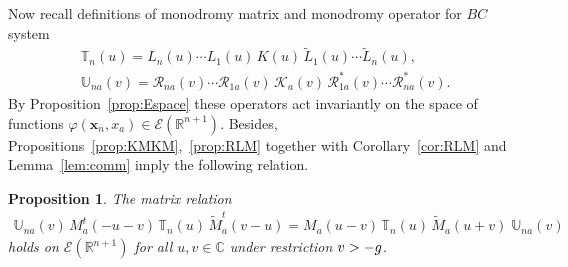 \documentclass[11pt]{article}
\numberwithin{equation}{section}
\theoremstyle{plain}
\newtheorem{proposition}{Proposition}
\theoremstyle{definition}
\newcommand{\T}{\mathbb{T}}
\newcommand{\MMO}{\mathbb{U}}
\let\Im\relax
\DeclareMathOperator{\Im}{Im}
\renewcommand{\phi}{\varphi}
\begin{document}
Now recall definitions of monodromy matrix and monodromy operator for $BC$ system
\begin{align}
	& \T_n(u) = L_n(u) \cdots L_1(u) \, K(u) \, \widetilde{L}_1(u) \cdots \widetilde{L}_n(u) , \\[6pt] \label{mon-op-BC2}
	& \MMO_{na}(v) = \mathcal{R}_{na}(v) \cdots \mathcal{R}_{1a}(v) \, \mathcal{K}_a(v) \, \mathcal{R}^*_{1a}(v) \cdots \mathcal{R}^*_{na}(v).
\end{align}
By Proposition~\ref{prop:Espace} these operators act invariantly on the space of functions $\phi(\bm{x}_n, x_a) \in \mathcal{E}(\mathbb{R}^{n + 1})$. Besides, Propositions~\ref{prop:KMKM},~\ref{prop:RLM} together with Corollary~\ref{cor:RLM} and Lemma~\ref{lem:comm} imply the following relation.

\begin{proposition} \label{prop:UMTM}
	The matrix relation
	\begin{align}\label{UMTM2}
		\MMO_{na}(v) \, M_a^t(- u - v) \, \T_n(u) \, \widetilde{M}^t_a(v - u) = M_a(u - v) \, \T_n(u) \, \widetilde{M}_a(u + v) \; \MMO_{na}(v)
	\end{align}
	holds on $\mathcal{E}(\mathbb{R}^{n + 1})$ for all $u,v \in \mathbb{C}$ under restriction $\Im v > -g$.
\end{proposition}
\end{document}

